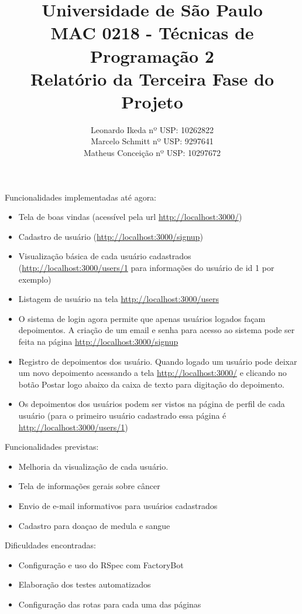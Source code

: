 \documentclass[12pt,a4paper]{article}
\title{{\bf Universidade de São Paulo} \\MAC 0218 - Técnicas de Programação 2 \\ Relatório da Terceira Fase do Projeto}
\author{Leonardo Ikeda     nº USP: 10262822 \\
	    Marcelo Schmitt    nº USP: 9297641\\
	    Matheus Conceição  nº USP: 10297672}
\begin{document}
\date{}
\maketitle


\noindent Funcionalidades implementadas até agora:
\begin{itemize}
	\item Tela de boas vindas (acessível pela url \url{http://localhost:3000/})
	\item Cadastro de usuário (\url{http://localhost:3000/signup})
	\item Visualização básica de cada usuário cadastrados (\url{http://localhost:3000/users/1} para informações do usuário de id 1 por exemplo)
	\item Listagem de usuário na tela \url{http://localhost:3000/users}
	\item O sistema de login agora permite que apenas usuários logados façam depoimentos. A criação de um email e senha para acesso ao sistema pode ser feita na página \url{http://localhost:3000/signup}
	\item Registro de depoimentos dos usuário. Quando logado um usuário pode deixar um novo depoimento acessando a tela \url{http://localhost:3000/} e clicando no botão Postar logo abaixo da caixa de texto para digitação do depoimento.
	\item Os depoimentos dos usuários podem ser vistos na página de perfil de cada usuário (para o primeiro usuário cadastrado essa página é \url{http://localhost:3000/users/1})

\end{itemize}

\noindent Funcionalidades previstas:
\begin{itemize}
	\item Melhoria da visualização de cada usuário.
	\item Tela de informações gerais sobre câncer
	\item Envio de e-mail informativos para usuários cadastrados
	\item Cadastro para doaçao de medula e sangue
\end{itemize}

\noindent Dificuldades encontradas:
\begin{itemize}
	\item Configuração e uso do RSpec com FactoryBot
	\item Elaboração dos testes automatizados
	\item Configuração das rotas para cada uma das páginas
\end{itemize}
\end{document}
